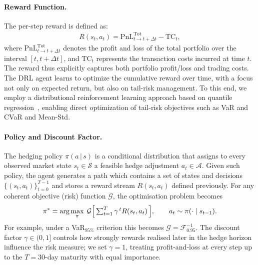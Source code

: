\documentclass[a4paper,fleqn]{cas-dc}
\begin{document}
\paragraph{Reward Function.} 
The per-step reward is defined as:
\begin{align}
R(s_t, a_t) = \text{PnL}_{t \to t+\Delta t}^{\text{Tot}} - \text{TC}_t,
\end{align}
where $\text{PnL}_{t \to t+\Delta t}^{\text{Tot}}$ denotes the profit and loss of the total portfolio over the interval $[t, t+\Delta t]$, and $\text{TC}_t$ represents the transaction costs incurred at time $t$. The reward thus explicitly captures both portfolio profit/loss and trading costs. The DRL agent learns to optimize the cumulative reward over time, with a focus not only on expected return, but also on tail-risk management. To this end, we employ a distributional reinforcement learning approach based on quantile regression~\cite{DH_1, DH_01}, enabling direct optimization of tail-risk objectives such as VaR and CVaR and Mean-Std.

\paragraph{Policy and Discount Factor.}
The hedging policy $\pi(a\,|\,s)$ is a conditional distribution that assigns to every observed market state $s_t\in\mathcal S$ a feasible hedge adjustment $a_t\in\mathcal A$.  Given such policy, the agent generates a path which contains a set of states and decisions $\{(s_t,a_t)\}_{t=0}^{T-1}$ and stores a reward stream $R(s_t,a_t)$ defined previously.  For any coherent objective (risk) function $\mathcal{G}$, the optimisation problem becomes
\begin{equation*}
\pi^{*}
= \arg\max_{\pi}\;
\mathcal{G}\Bigl[\,
\textstyle\sum_{t=1}^{T}\gamma^{\,t}R(s_t,a_t)
\,\Bigr],
\qquad a_t\sim\pi(\cdot\mid s_{t-1}).
\end{equation*}
For example, under a VaR$_{95\%}$ criterion this becomes
$\mathcal{G}=\mathcal{F}^{-1}_{0.95}$.  
The discount factor $\gamma\in(0,1]$ controls how strongly rewards realised later in the hedge horizon influence the risk measure; we set $\gamma=1$, treating profit-and-loss at every step up to the $T\!=\!30$-day maturity with equal importance.
\end{document}
